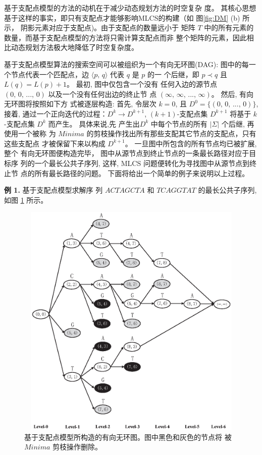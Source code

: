 \vspace{0.3cm}基于支配点模型的方法的动机在于减少动态规划方法的时空复杂
度。 其核心思想基于这样的事实，即只有支配点才能够影响MLCS的构建（如
图\ref{fig:DM} (b) 所示， 阴影元素对应于支配点)。由于支配点的数量远小于
矩阵 $T$ 中的所有元素的数量，而基于支配点模型的方法将只需计算支配点而非
整个矩阵的元素，因此相比动态规划方法极大地降低了时空复杂度。

基于支配点模型算法的搜索空间可以被组织为一个有向无环图(DAG): 图中的每一
个节点代表一个匹配点，边 $\langle p,\, q \rangle$ 代表 $q$ 是 $p$ 的一
个后继，即 $p \prec q$ 且 $L(q) = L(p) + 1$。 最初, 图中仅包含一个没有
任何入边的源节点 $(0,\, 0,\, ...,\, 0)$ 以及一个没有任何出边的终止节
点 $(\infty,\, \infty,\, ...,\, \infty)$。 然后, 有向无环图将按照如下方
式被逐层构造: 首先, 令层次 $k = 0$, 且 $D^0 = \{(0,\, 0,\, ...,\,
0)\}$, 接着, 通过一个正向迭代的过程：$D^k \rightarrow D^{k+1}$,
$(k+1)$-支配点集 $D^{k+1}$ 将基于 $k$-支配点集 $D^k$ 而产生。 具体来说,先
产生出$D^k$ 中每个节点的所有 $|\Sigma|$ 个后继, 再使用一个被称
为 $Minima$ 的剪枝操作找出所有那些支配其它节点的支配点，只有这些支配点
才被保留下来以构成 $D^{k+1}$。 一旦图中所包含的所有节点均已被扩展, 整个
有向无环图便构造完毕， 图中从源节点到终止节点的一条最长路径对应于目标序
列的一个最长公共子序列, 这样, MLCS 问题便转化为寻找图中从源节点到终止节
点的所有最长路径的问题。 下面将给出一个简单的例子来说明以上过程。

\vspace{0.2cm} \textbf{例 1.} 基于支配点模型求解序
列 $ACTAGCTA$ 和 $TCAGGTAT$ 的最长公共子序列,如图 \ref{fig:DAG} 所示。

\begin{figure}[!h]
  \centering
  \includegraphics[height=4.5in, width=4.5in]{figures/4_MLCS/DAG}
  \vspace{1.5em}
  \caption{基于支配点模型所构造的有向无环图。图中黑色和灰色的节点将
    被 $Minima$ 剪枝操作删除。}
  \label{fig:DAG}
\end{figure}


